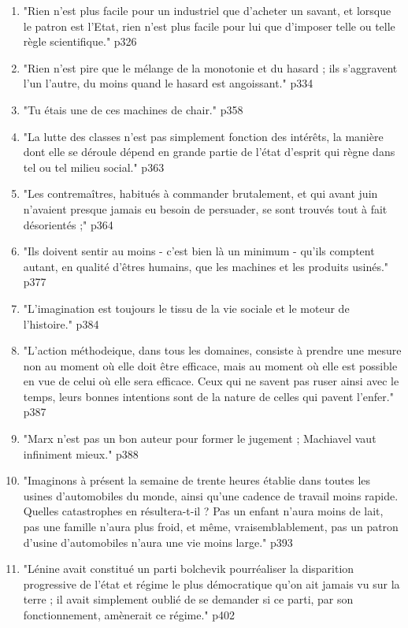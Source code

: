 \documentclass[a4paper,12pt]{book}
\newcommand{\Cit}[2]{\begin{tcolorbox}[sharp corners, colback=white,colframe=red!90!black!75, title=Citations : #1]#2\end{tcolorbox}}
\begin{document}
\Cit{La Condition Ouvrière 3}{\begin{enumerate}
\item "Rien n'est plus facile pour un industriel que d'acheter un savant, et lorsque le patron est l'Etat, rien n'est plus facile pour lui que d'imposer telle ou telle règle scientifique." p326
\item "Rien n'est pire que le mélange de la monotonie et du hasard ; ils s'aggravent l'un l'autre, du moins quand le hasard est angoissant." p334
\item "Tu étais une de ces machines de chair." p358
\item "La lutte des classes n'est pas simplement fonction des intérêts, la manière dont elle se déroule dépend en grande partie de l'état d'esprit qui règne dans tel ou tel milieu social." p363
\item "Les contremaîtres, habitués à commander brutalement, et qui avant juin n'avaient presque jamais eu besoin de persuader, se sont trouvés tout à fait désorientés ;" p364
\item "Ils doivent sentir au moins - c'est bien là un minimum - qu'ils comptent autant, en qualité d'êtres humains, que les machines et les produits usinés." p377
\item "L'imagination est toujours le tissu de la vie sociale et le moteur de l'histoire." p384
\item "L'action méthodeique, dans tous les domaines, consiste à prendre une mesure non au moment où elle doit être efficace, mais au moment où elle est possible en vue de celui où elle sera efficace. Ceux qui ne savent pas ruser ainsi avec le temps, leurs bonnes intentions sont de la nature de celles qui pavent l'enfer." p387
\item "Marx n'est pas un bon auteur pour former le jugement ; Machiavel vaut infiniment mieux." p388
\item "Imaginons à présent la semaine de trente heures établie dans toutes les usines d'automobiles du monde, ainsi qu'une cadence de travail moins rapide. Quelles catastrophes en résultera-t-il ? Pas un enfant n'aura moins de lait, pas une famille n'aura plus froid, et même, vraisemblablement, pas un patron d'usine d'automobiles n'aura une vie moins large." p393
\item "Lénine avait constitué un parti bolchevik pourréaliser la disparition progressive de l'état et régime le plus démocratique qu'on ait jamais vu sur la terre ; il avait simplement oublié de se demander si ce parti, par son fonctionnement, amènerait ce régime." p402

\end{enumerate}}
\end{document}
